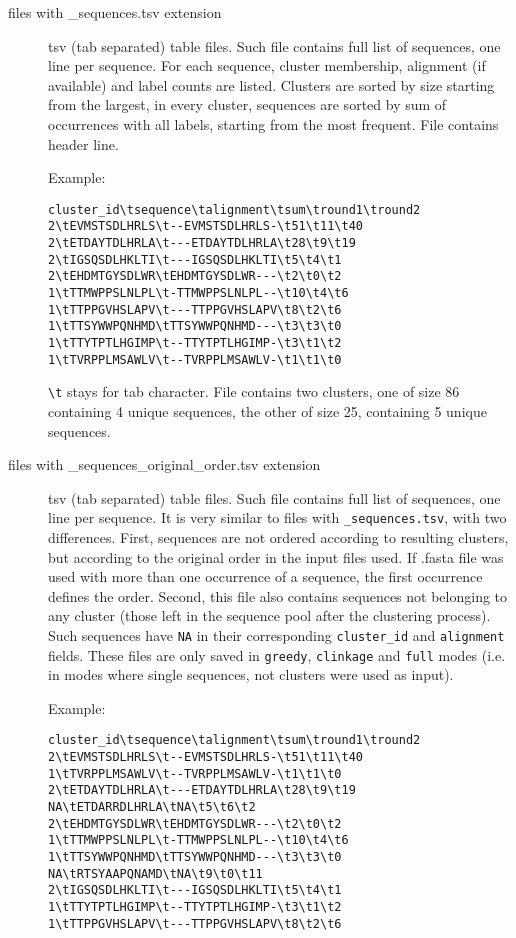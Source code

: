 \documentclass[11pt, a4paper, twoside, titlepage]{article}
\begin{document}
\begin{description}

\item[files with \_sequences.tsv extension] tsv (tab separated) table files. Such file contains full list of sequences, one line per sequence. For each sequence, cluster membership, alignment (if available) and label counts are listed. Clusters are sorted by size starting from the largest, in every cluster, sequences are sorted by sum of occurrences with all labels, starting from the most frequent. File contains header line.

Example:

\begin{verbatim}
cluster_id\tsequence\talignment\tsum\tround1\tround2
2\tEVMSTSDLHRLS\t--EVMSTSDLHRLS-\t51\t11\t40
2\tETDAYTDLHRLA\t---ETDAYTDLHRLA\t28\t9\t19
2\tIGSQSDLHKLTI\t---IGSQSDLHKLTI\t5\t4\t1
2\tEHDMTGYSDLWR\tEHDMTGYSDLWR---\t2\t0\t2
1\tTTMWPPSLNLPL\t-TTMWPPSLNLPL--\t10\t4\t6
1\tTTPPGVHSLAPV\t---TTPPGVHSLAPV\t8\t2\t6
1\tTTSYWWPQNHMD\tTTSYWWPQNHMD---\t3\t3\t0
1\tTTYTPTLHGIMP\t--TTYTPTLHGIMP-\t3\t1\t2
1\tTVRPPLMSAWLV\t--TVRPPLMSAWLV-\t1\t1\t0
\end{verbatim}

\texttt{\textbackslash t} stays for tab character. File contains two clusters, one of size 86 containing 4 unique sequences, the other of size 25, containing 5 unique sequences.

\item[files with \_sequences\_original\_order.tsv extension] tsv (tab separated) table files. Such file contains full list of sequences, one line per sequence. It is very similar to files with \texttt{\_sequences.tsv}, with two differences. First, sequences are not ordered according to resulting clusters, but according to the original order in the input files used. If .fasta file was used with more than one occurrence of a sequence, the first occurrence defines the order. Second, this file also contains sequences not belonging to any cluster (those left in the sequence pool after the clustering process). Such sequences have \texttt{NA} in their corresponding \texttt{cluster\_id} and \texttt{alignment} fields. These files are only saved in \texttt{greedy}, \texttt{clinkage} and \texttt{full} modes (i.e. in modes where single sequences, not clusters were used as input).

Example:

\begin{verbatim}
cluster_id\tsequence\talignment\tsum\tround1\tround2
2\tEVMSTSDLHRLS\t--EVMSTSDLHRLS-\t51\t11\t40
1\tTVRPPLMSAWLV\t--TVRPPLMSAWLV-\t1\t1\t0
2\tETDAYTDLHRLA\t---ETDAYTDLHRLA\t28\t9\t19
NA\tETDARRDLHRLA\tNA\t5\t6\t2
2\tEHDMTGYSDLWR\tEHDMTGYSDLWR---\t2\t0\t2
1\tTTMWPPSLNLPL\t-TTMWPPSLNLPL--\t10\t4\t6
1\tTTSYWWPQNHMD\tTTSYWWPQNHMD---\t3\t3\t0
NA\tRTSYAAPQNAMD\tNA\t9\t0\t11
2\tIGSQSDLHKLTI\t---IGSQSDLHKLTI\t5\t4\t1
1\tTTYTPTLHGIMP\t--TTYTPTLHGIMP-\t3\t1\t2
1\tTTPPGVHSLAPV\t---TTPPGVHSLAPV\t8\t2\t6
\end{verbatim}


\end{description}
\end{document}
